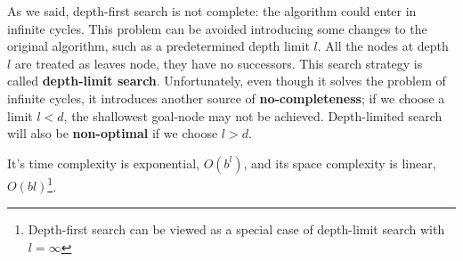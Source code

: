 As we said, depth-first search is not complete: the algorithm could enter in infinite cycles. This problem can be avoided introducing some changes to the original algorithm, such as
a predetermined depth limit $l$. All the nodes at depth $l$ are treated as leaves node, they have no successors. This search strategy is called \textbf{depth-limit search}.
Unfortunately, even though it solves the problem of infinite cycles, it introduces another source of \textbf{no-completeness}; if we choose a limit $l < d$, the shallowest goal-node
may not be achieved. Depth-limited search will also be \textbf{non-optimal} if we choose $l > d$. \vspace{3.5pt}

It's time complexity is exponential, $O(b^l)$, and its space complexity is linear, $O(bl)$\footnote{Depth-first search can be viewed as a special case of depth-limit search with $l=\infty$}.